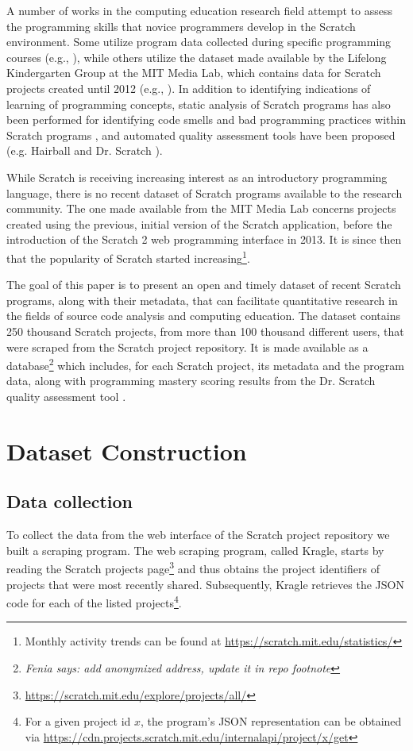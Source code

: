 \documentclass[10pt, conference]{IEEEtran}
\newcommand{\fenia}[1]{\emph{\color{blue}Fenia says: #1}}
\begin{document}
A number of works in the computing education research field attempt to assess the programming skills that novice programmers develop in the Scratch environment.
Some utilize program data collected during specific programming courses (e.g., \cite{meerbaum-salant_learning_2010, wilson_evaluation_2012, Maloney_2008}), while others utilize the dataset made available by the Lifelong Kindergarten Group at the MIT Media Lab, which contains data for Scratch projects created until 2012 (e.g., \cite{fields_2014, yang_2015, Dasgupta_2016}).
In addition to identifying indications of learning of programming concepts, static analysis of Scratch programs has also been performed for identifying code smells and bad programming practices within Scratch programs \cite{Meerbaum_habits_2011, Aivaloglou_2016}, and automated quality assessment tools have been proposed (e.g. Hairball \cite{boe_hairball:_2013} and Dr. Scratch \cite{moreno_automatic_2014}).

While Scratch is receiving increasing interest as an introductory programming language, there is no recent dataset of Scratch programs available to the research community.
The one made available from the MIT Media Lab concerns projects created using the previous, initial version of the Scratch application, before the introduction of the Scratch 2 web programming interface in 2013.
It is since then that the popularity of Scratch started increasing\footnote{Monthly activity trends can be found at \url{https://scratch.mit.edu/statistics/}}.

The goal of this paper is to present an open and timely dataset of recent Scratch programs, along with their metadata, that can facilitate quantitative research in the fields of source code analysis and computing education.
The dataset contains 250 thousand Scratch projects, from more than 100 thousand different users, that were scraped from the Scratch project repository.
It is made available as a database\footnote{{\fenia{add anonymized address, update it in repo footnote}}} which includes, for each Scratch project, its metadata and the program data, along with programming mastery scoring results from the Dr. Scratch quality assessment tool \cite{moreno_automatic_2014}.

\section{Dataset Construction}
\label{dataset}

\subsection{Data collection}
To collect the data from the web interface of the Scratch project repository we built a scraping program.
The web scraping program, called Kragle, starts by reading the Scratch projects page\footnote{\label{scratchpublic}\url{https://scratch.mit.edu/explore/projects/all/}} and thus obtains the project identifiers of projects that were most recently shared.
Subsequently, Kragle retrieves the JSON code for each of the listed projects\footnote{For a given project id $x$, the program's JSON representation can be obtained via \url{https://cdn.projects.scratch.mit.edu/internalapi/project/x/get}}.
\end{document}
